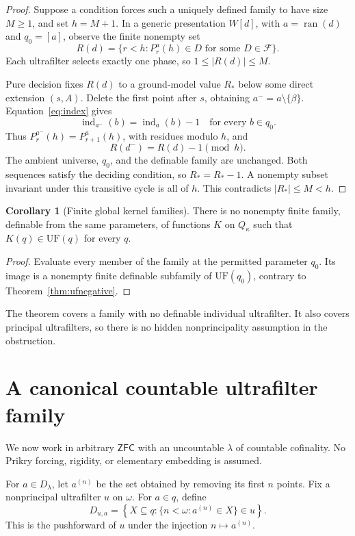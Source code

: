 \documentclass[11pt,letterpaper]{article}
\theoremstyle{definition}
\newtheorem{corollary}[definition]{Corollary}
\numberwithin{equation}{section}
\newcommand{\ZFC}{\mathsf{ZFC}}
\newcommand{\UF}{\mathrm{UF}}
\newcommand{\ran}{\operatorname{ran}}
\newcommand{\FFam}{\mathscr F}
\newcommand{\ind}{\operatorname{ind}}
\begin{document}
\begin{proof}
Suppose a condition forces such a uniquely defined family to have size $M\ge1$, and set $h=M+1$. In a generic presentation $W[d]$, with $a=\ran(d)$ and $q_0=[a]$, observe the finite nonempty set
\[
 R(d)=\{r<h:P_r^a(h)\in D\text{ for some }D\in\FFam\}.
\]
Each ultrafilter selects exactly one phase, so $1\le|R(d)|\le M$.

Pure decision fixes $R(d)$ to a ground-model value $R_*$ below some direct extension $(s,A)$. Delete the first point after $s$, obtaining $a^-=a\setminus\{\beta\}$. Equation~\eqref{eq:index} gives
\[
 \ind_{a^-}(b)=\ind_a(b)-1
 \quad\text{for every }b\in q_0.
\]
Thus $P_r^{a^-}(h)=P_{r+1}^a(h)$, with residues modulo $h$, and
\[
 R(d^-)=R(d)-1\pmod h.
\]
The ambient universe, $q_0$, and the definable family are unchanged. Both sequences satisfy the deciding condition, so $R_*=R_*-1$. A nonempty subset invariant under this transitive cycle is all of $h$. This contradicts $|R_*|\le M<h$.
\end{proof}

\begin{corollary}[Finite global kernel families]\label{cor:kernels}
There is no nonempty finite family, definable from the same parameters, of functions $K$ on $Q_\kappa$ such that $K(q)\in\UF(q)$ for every $q$.
\end{corollary}

\begin{proof}
Evaluate every member of the family at the permitted parameter $q_0$. Its image is a nonempty finite definable subfamily of $\UF(q_0)$, contrary to Theorem~\ref{thm:ufnegative}.
\end{proof}

The theorem covers a family with no definable individual ultrafilter. It also covers principal ultrafilters, so there is no hidden nonprincipality assumption in the obstruction.

\section{A canonical countable ultrafilter family}\label{sec:ufpositive}

We now work in arbitrary $\ZFC$ with an uncountable $\lambda$ of countable cofinality. No Prikry forcing, rigidity, or elementary embedding is assumed.

For $a\in D_\lambda$, let $a^{(n)}$ be the set obtained by removing its first $n$ points. Fix a nonprincipal ultrafilter $u$ on $\omega$. For $a\in q$, define
\[
 D_{u,a}=\left\{X\subseteq q:
              \{n<\omega:a^{(n)}\in X\}\in u\right\}.
 \label{eq:pushforward}\tag{10}
\]
This is the pushforward of $u$ under the injection $n\mapsto a^{(n)}$.
\end{document}
